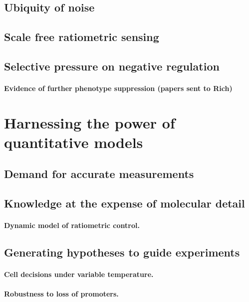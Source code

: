 	\subsection{Ubiquity of noise}	
	
	\subsection{Scale free ratiometric sensing}
	
	\subsection{Selective pressure on negative regulation}
	
		\paragraph{Evidence of further phenotype suppression (papers sent to Rich)}

\section{Harnessing the power of quantitative models}

	\subsection{Demand for accurate measurements}
	
	\subsection{Knowledge at the expense of molecular detail}
		\paragraph{Dynamic model of ratiometric control.}		
		
	\subsection{Generating hypotheses to guide experiments}
		\paragraph{Cell decisions under variable temperature.}		
		\paragraph{Robustness to loss of promoters.}
